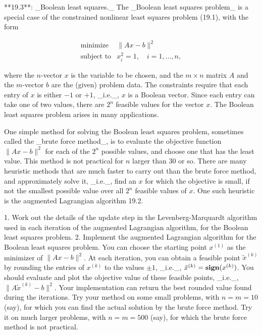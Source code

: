 

**19.3**: _Boolean least squares._ The _Boolean least squares problem_ is a special case of the constrained nonlinear least squares problem (19.1), with the form

\[\begin{array}{ll}\mbox{minimize}&\|Ax-b\|^{2}\\ \mbox{subject to}&x_{i}^{2}=1,\quad i=1,\ldots,n,\end{array}\]

where the \(n\)-vector \(x\) is the variable to be chosen, and the \(m\times n\) matrix \(A\) and the \(m\)-vector \(b\) are the (given) problem data. The constraints require that each entry of \(x\) is either \(-1\) or \(+1\), _i.e._, \(x\) is a Boolean vector. Since each entry can take one of two values, there are \(2^{n}\) feasible values for the vector \(x\). The Boolean least squares problem arises in many applications.

One simple method for solving the Boolean least squares problem, sometimes called the _brute force method_, is to evaluate the objective function \(\|Ax-b\|^{2}\) for each of the \(2^{n}\) possible values, and choose one that has the least value. This method is not practical for \(n\) larger than 30 or so. There are many heuristic methods that are much faster to carry out than the brute force method, and approximately solve it, _i.e._, find an \(x\) for which the objective is small, if not the smallest possible value over all \(2^{n}\) feasible values of \(x\). One such heuristic is the augmented Lagrangian algorithm 19.2.

1. Work out the details of the update step in the Levenberg-Marquardt algorithm used in each iteration of the augmented Lagrangian algorithm, for the Boolean least squares problem.
2. Implement the augmented Lagrangian algorithm for the Boolean least squares problem. You can choose the starting point \(x^{(1)}\) as the minimizer of \(\|Ax-b\|^{2}\). At each iteration, you can obtain a feasible point \(\tilde{x}^{(k)}\) by rounding the entries of \(x^{(k)}\) to the values \(\pm 1\), _i.e._, \(\tilde{x}^{(k)}=\mbox{\bf sign}(x^{(k)})\). You should evaluate and plot the objective value of these feasible points, _i.e._, \(\|A\tilde{x}^{(k)}-b\|^{2}\). Your implementation can return the best rounded value found during the iterations. Try your method on some small problems, with \(n=m=10\) (say), for which you can find the actual solution by the brute force method. Try it on much larger problems, with \(n=m=500\) (say), for which the brute force method is not practical.

